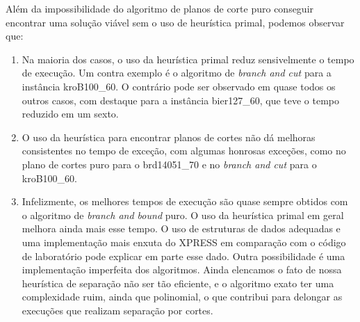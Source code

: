 \documentclass[11pt]{article}
\begin{document}
Além da impossibilidade do algoritmo de planos de corte puro conseguir
encontrar uma solução viável sem o uso de heurística primal, podemos
observar que:

\begin{enumerate}
 \item Na maioria dos casos, o uso da heurística primal reduz
       sensivelmente o tempo de execução. Um contra exemplo é o
       algoritmo de \emph{branch and cut} para a instância
       kroB100\_60. O contrário pode ser observado em quase todos os
       outros casos, com destaque para a instância bier127\_60, que teve
       o tempo reduzido em um sexto. 
 \item O uso da heurística para encontrar planos de cortes não dá
       melhoras consistentes no tempo de exceção, com algumas honrosas
       exceções, como no plano de cortes puro para o brd14051\_70 e no
       \emph{branch and cut} para o kroB100\_60.
 \item Infelizmente, os melhores tempos de execução são quase sempre
       obtidos com o algoritmo de \emph{branch and bound} puro. O uso da
       heurística primal em geral melhora ainda mais esse tempo. O uso
       de estruturas de dados adequadas e uma implementação mais enxuta
       do XPRESS em comparação com o código de laboratório pode explicar
       em parte esse dado. Outra possibilidade é uma implementação
       imperfeita dos algoritmos. Ainda elencamos o fato de nossa
       heurística de separação não ser tão eficiente, e o algoritmo
       exato ter uma complexidade ruim, ainda que polinomial, o que
       contribui para delongar as execuções que realizam separação por
       cortes. 
\end{enumerate} 



\end{document}
